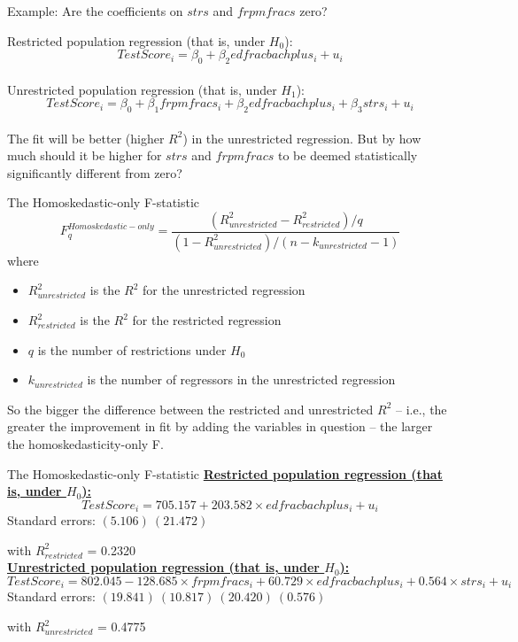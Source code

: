 \documentclass[notes,10pt, aspectratio=169]{beamer}
\begin{document}
\begin{frame}{Example: Are the coefficients on $strs$ and $frpmfracs$ zero?}


Restricted population regression (that is, under $H_0$):
\begin{equation*}
    TestScore_i = \beta_0 + \beta_2 edfracbachplus_i + u_i
\end{equation*}
\\[1em]
Unrestricted population regression (that is, under $H_1$):
\begin{equation*}
    TestScore_i = \beta_0 + \beta_1 frpmfracs_i + \beta_2 edfracbachplus_i + \beta_3 strs_i + u_i
\end{equation*}
\\[1em]
The fit will be better (higher $R^2$) in the unrestricted regression. But by how much should it be higher for $strs$ and $frpmfracs$ to be deemed statistically significantly different from zero?
\end{frame}


\begin{frame}{The Homoskedastic-only F-statistic}
\begin{equation*}
    F^{Homoskedastic-only}_q=\frac{(R^2_{unrestricted}-R^2_{restricted})/q}{(1-R^2_{unrestricted})/(n-k_{unrestricted}-1)}
\end{equation*}
where
\begin{itemize}
    \item $R^2_{unrestricted}$ is the $R^2$ for the unrestricted regression
    \item $R^2_{restricted}$ is the $R^2$ for the restricted regression
    \item $q$ is the number of restrictions under $H_0$
    \item $k_{unrestricted}$ is the number of regressors in the unrestricted regression
\end{itemize}
\vspace{1em}
So the bigger the difference between the restricted and unrestricted $R^2$ -- i.e., the greater the improvement in fit by adding the variables in question -- the larger the homoskedasticity-only F.

\end{frame}


\begin{frame}{The Homoskedastic-only F-statistic}
\underline{\textbf{Restricted population regression (that is, under $H_0$):}}
\begin{equation*}
TestScore_i = 705.157 + 203.582 \times edfracbachplus_i + u_i
\end{equation*}
Standard errors: $(5.106)\ (21.472)$

with $R^2_{restricted}$ = 0.2320\\[2em]
\underline{\textbf{Unrestricted population regression (that is, under $H_0$):}}
\begin{equation*}
TestScore_i = 802.045 - 128.685 \times frpmfracs_i + 60.729 \times edfracbachplus_i + 0.564 \times strs_i + u_i
\end{equation*}
Standard errors: $(19.841)\ (10.817)\ (20.420)\ (0.576)$

with $R^2_{unrestricted}$ = 0.4775
\end{frame}
\end{document}
